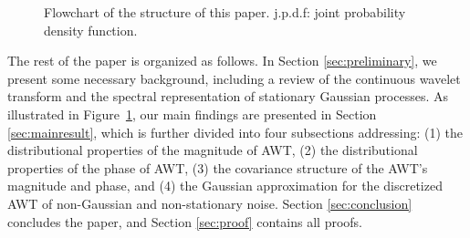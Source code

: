 \documentclass{amsart}
\begin{document}
\begin{figure}[htb!]
\begin{center}
\end{center}
\caption{Flowchart of the structure of this paper. j.p.d.f: joint probability density function.}
\label{fig:flowchart:structure}
\end{figure}




The rest of the paper is organized as follows.
In Section \ref{sec:preliminary}, we present some necessary background, including a review of the continuous wavelet transform and the spectral representation of stationary Gaussian processes.
As illustrated in Figure~\ref{fig:flowchart:structure}, our main findings are presented in Section \ref{sec:mainresult}, which is further divided into four subsections addressing: (1) the distributional properties of the magnitude of AWT, (2) the distributional properties of the phase of AWT, (3) the covariance structure of the AWT's magnitude and phase,
and (4)
the Gaussian approximation for the discretized AWT of non-Gaussian and non-stationary noise.
Section \ref{sec:conclusion} concludes the paper, and Section \ref{sec:proof} contains all proofs.
\end{document}
